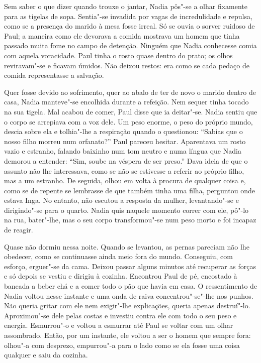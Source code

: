 Sem saber o que dizer quando trouxe o jantar, Nadia pôs"-se a olhar
fixamente para as tigelas de sopa. Sentia"-se invadida por vagas de
incredulidade e repulsa, como se a presença do marido à mesa fosse
irreal. Só se ouvia o sorver ruidoso de Paul; a maneira como ele
devorava a comida mostrava um homem que tinha passado muita fome no
campo de detenção. Ninguém que Nadia conhecesse comia com aquela
voracidade. Paul tinha o rosto quase dentro do prato; os olhos
reviravam"-se e ficavam úmidos. Não deixou restos: era como se cada
pedaço de comida representasse a salvação.

Quer fosse devido ao sofrimento, quer ao abalo de ter de novo o marido
dentro de casa, Nadia manteve"-se encolhida durante a refeição. Nem
sequer tinha tocado na sua tigela. Mal acabou de comer, Paul disse que
ia deitar"-se. Nadia sentiu que o corpo se arrepiava com a voz dele. Um
peso enorme, o peso do próprio mundo, descia sobre ela e
tolhia"-lhe a respiração quando o questionou: ``Sabias que o nosso filho
morreu num orfanato?'' Paul pareceu hesitar. Aparentava um rosto vazio e
estranho, falando baixinho num tom neutro e numa língua que Nadia
demorou a entender: ``Sim, soube na véspera de ser preso.'' Dava ideia de
que o assunto não lhe interessava, como se não se estivesse a referir
ao próprio filho, mas a um estranho. De seguida, olhou em volta à
procura de qualquer coisa e, como se de repente se lembrasse de que
também tinha uma filha, perguntou onde estava Inga. No entanto, não
escutou a resposta da mulher, levantando"-se e dirigindo"-se para o
quarto. Nadia quis naquele momento correr com ele, pô"-lo na rua,
bater"-lhe, mas o seu corpo transformou"-se num peso morto e foi incapaz
de reagir.

Quase não dormiu nessa noite. Quando se levantou, as
pernas pareciam não lhe obedecer, como se continuasse ainda meio fora do
mundo. Conseguiu, com esforço, erguer"-se da cama. Deixou passar alguns
minutos até recuperar as forças e só depois se vestiu e dirigiu à
cozinha. Encontrou Paul de pé, encostado à bancada a beber chá e a comer
todo o pão que havia em casa. O ressentimento de Nadia voltou nesse
instante e uma onda de raiva concentrou"-se"-lhe nos punhos. Não queria
gritar com ele nem exigir"-lhe explicações, queria apenas destruí"-lo.
Aproximou"-se dele pelas costas e investiu contra ele com todo o seu peso
e energia. Esmurrou"-o e voltou a esmurrar até Paul se voltar com um
olhar assombrado. Então, por um instante, ele voltou a ser o homem que
sempre fora: olhou"-a com desprezo, empurrou"-a para o lado como se ela
fosse uma coisa qualquer e saiu da cozinha.

